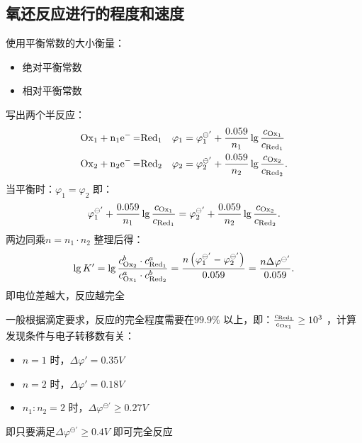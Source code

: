 \subsection{氧还反应进行的程度和速度}%
\label{sub:氧还反应进行的程度和速度}
使用平衡常数的大小衡量：
\begin{itemize}
    \item 绝对平衡常数
    \item 相对平衡常数
\end{itemize}
\begin{eg}
    写出两个半反应：
    \begin{align*}
        \ce{\ce{Ox_1} +n_1e- =\ce{Red_1}}\quad &\varphi_1=\varphi_1^{\ominus'}+\frac{0.059}{n_1}\lg \frac{c_{\ce{Ox_1}}}{c_{\ce{Red_1}}}\\
        \ce{\ce{Ox_2} +n_2e- =\ce{Red_2}}\quad &\varphi_2=\varphi_2^{\ominus'}+\frac{0.059}{n_2}\lg \frac{c_{\ce{Ox_2}}}{c_{\ce{Red_2}}}
    .\end{align*}
    当平衡时：$\varphi_1=\varphi_2$ 即：
    \[
        \varphi_1^{\ominus'}+\frac{0.059}{n_1}\lg \frac{c_{\ce{Ox_1}}}{c_{\ce{Red_1}}}=\varphi_2^{\ominus'}+\frac{0.059}{n_2}\lg \frac{c_{\ce{Ox_2}}}{c_{\ce{Red_2}}}
    .\]
    两边同乘$n=n_1\cdot n_2$ 整理后得：\[
        \lg K'=\lg \frac{c^{b}_{\ce{Ox_2}}\cdot c^{a}_{\ce{Red_1}}}{c^{a}_{\ce{Ox_1}}\cdot c^{b}_{\ce{Red_2}}}=\frac{n\left( \varphi_1^{\ominus'}-\varphi_2^{\ominus'} \right)}{0.059}=\frac{n\Delta\varphi^{\ominus'}}{0.059}
    .\]
    即电位差越大，反应越完全
\end{eg}
\begin{notation}
    一般根据滴定要求，反应的完全程度需要在$99.9\%$ 以上，即：$\frac{c_{\ce{Red_1}}}{c_{\ce{Ox_1}}}\ge 10^3 $ ，计算发现条件与电子转移数有关：
    \begin{itemize}
        \item $n=1$ 时，$\Delta\varphi'=0.35V$
        \item $n=2$ 时，$\Delta\varphi'=0.18V$
        \item $n_1:n_2=2$ 时，$\Delta\varphi^{\ominus'}\ge 0.27V$
    \end{itemize}
    即只要满足$\Delta\varphi^{\ominus'}\ge 0.4V$ 即可完全反应
\end{notation}
